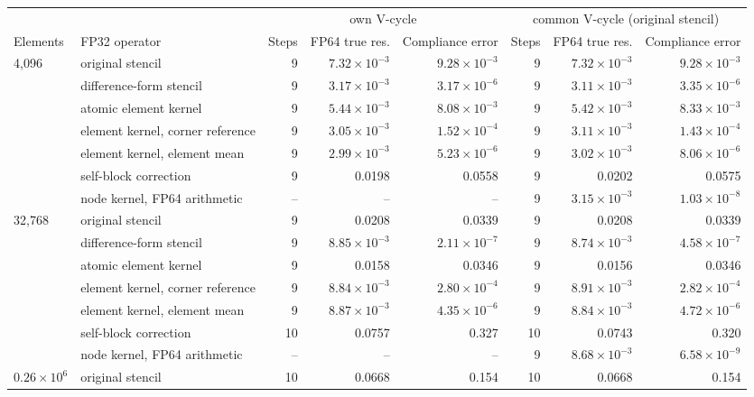 \begin{tabular}{llrrrrrr}
\toprule
 & & \multicolumn{3}{c}{own V-cycle} & \multicolumn{3}{c}{common V-cycle (original stencil)} \\
\cmidrule(lr){3-5}\cmidrule(lr){6-8}
Elements & FP32 operator & Steps & FP64 true res. & Compliance error & Steps & FP64 true res. & Compliance error \\
\midrule
4{,}096 & original stencil & 9 & $7.32\times10^{-3}$ & $9.28\times10^{-3}$ & 9 & $7.32\times10^{-3}$ & $9.28\times10^{-3}$ \\
 & difference-form stencil & 9 & $3.17\times10^{-3}$ & $3.17\times10^{-6}$ & 9 & $3.11\times10^{-3}$ & $3.35\times10^{-6}$ \\
 & atomic element kernel & 9 & $5.44\times10^{-3}$ & $8.08\times10^{-3}$ & 9 & $5.42\times10^{-3}$ & $8.33\times10^{-3}$ \\
 & element kernel, corner reference & 9 & $3.05\times10^{-3}$ & $1.52\times10^{-4}$ & 9 & $3.11\times10^{-3}$ & $1.43\times10^{-4}$ \\
 & element kernel, element mean & 9 & $2.99\times10^{-3}$ & $5.23\times10^{-6}$ & 9 & $3.02\times10^{-3}$ & $8.06\times10^{-6}$ \\
 & self-block correction & 9 & 0.0198 & 0.0558 & 9 & 0.0202 & 0.0575 \\
 & node kernel, FP64 arithmetic & -- & -- & -- & 9 & $3.15\times10^{-3}$ & $1.03\times10^{-8}$ \\
32{,}768 & original stencil & 9 & 0.0208 & 0.0339 & 9 & 0.0208 & 0.0339 \\
 & difference-form stencil & 9 & $8.85\times10^{-3}$ & $2.11\times10^{-7}$ & 9 & $8.74\times10^{-3}$ & $4.58\times10^{-7}$ \\
 & atomic element kernel & 9 & 0.0158 & 0.0346 & 9 & 0.0156 & 0.0346 \\
 & element kernel, corner reference & 9 & $8.84\times10^{-3}$ & $2.80\times10^{-4}$ & 9 & $8.91\times10^{-3}$ & $2.82\times10^{-4}$ \\
 & element kernel, element mean & 9 & $8.87\times10^{-3}$ & $4.35\times10^{-6}$ & 9 & $8.84\times10^{-3}$ & $4.72\times10^{-6}$ \\
 & self-block correction & 10 & 0.0757 & 0.327 & 10 & 0.0743 & 0.320 \\
 & node kernel, FP64 arithmetic & -- & -- & -- & 9 & $8.68\times10^{-3}$ & $6.58\times10^{-9}$ \\
$0.26\times10^{6}$ & original stencil & 10 & 0.0668 & 0.154 & 10 & 0.0668 & 0.154 \\

\end{tabular}
